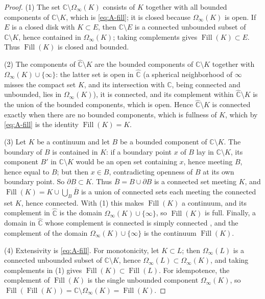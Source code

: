 \documentclass[11pt,reqno]{amsart}
\theoremstyle{definition}
\theoremstyle{remark}
\newcommand{\C}{\mathbb C}
\newcommand{\Chat}{\widehat{\mathbb C}}
\newcommand{\Fill}{\operatorname{Fill}}
\begin{document}
\begin{proof}
(1) The set $\C\setminus\Omega_\infty(K)$ consists of $K$ together with
all bounded components of $\C\setminus K$, which is \eqref{eq:A-fill}; it
is closed because $\Omega_\infty(K)$ is open.  If $E$ is a closed disk with
$K\subset E$, then $\C\setminus E$ is a connected unbounded subset of
$\C\setminus K$, hence contained in $\Omega_\infty(K)$; taking complements
gives $\Fill(K)\subset E$.  Thus $\Fill(K)$ is closed and
bounded.

(2) The components of $\Chat\setminus K$ are the bounded components of
$\C\setminus K$ together with $\Omega_\infty(K)\cup\{\infty\}$: the latter
set is open in $\Chat$ (a spherical neighborhood of $\infty$ misses the
compact set $K$, and its intersection with $\C$, being connected and
unbounded, lies in $\Omega_\infty(K)$), it is connected, and its
complement within $\Chat\setminus K$ is the union of the bounded
components, which is open.
Hence $\Chat\setminus K$ is connected exactly when there are no bounded
components, which is fullness of $K$, which by \eqref{eq:A-fill} is the
identity $\Fill(K)=K$.

(3) Let $K$ be a continuum and let $B$ be a bounded component of
$\C\setminus K$.  The boundary of $B$ is contained in $K$: if a boundary
point $x$ of $B$ lay in $\C\setminus K$, its component $B'$ in
$\C\setminus K$ would be an open set containing $x$, hence meeting $B$,
hence equal to $B$; but then $x\in B$, contradicting openness of $B$ at
its own boundary point.  So $\partial B\subset K$.  Thus $\overline{B}=B\cup\partial B$ is a
connected set meeting $K$, and
$\Fill(K)=K\cup\bigcup_B\overline{B}$ is a union of connected sets each
meeting the connected set $K$, hence connected.  With (1) this makes
$\Fill(K)$ a continuum, and its complement in $\Chat$ is the domain
$\Omega_\infty(K)\cup\{\infty\}$, so $\Fill(K)$ is full.  Finally, a
domain in $\Chat$ whose complement is connected is simply connected
\cite{New51,Why42}, and the complement of the domain
$\Omega_\infty(K)\cup\{\infty\}$ is the continuum $\Fill(K)$.

(4) Extensivity is \eqref{eq:A-fill}.  For monotonicity, let
$K\subset L$; then $\Omega_\infty(L)$ is a connected unbounded subset of
$\C\setminus K$, hence $\Omega_\infty(L)\subset\Omega_\infty(K)$, and
taking complements in (1) gives $\Fill(K)\subset\Fill(L)$.  For
idempotence, the complement of $\Fill(K)$ is the single unbounded
component $\Omega_\infty(K)$, so $\Fill(\Fill(K))=\C\setminus
\Omega_\infty(K)=\Fill(K)$.
\end{proof}
\end{document}
